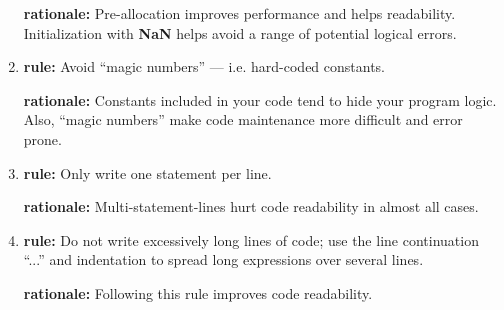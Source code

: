 \documentclass{tufte-book}
\theoremstyle{break}
\begin{document}
\begin{enumerate}
\textbf{rationale:} Pre-allocation improves performance and helps readability. Initialization with \textbf{NaN} helps avoid a range of potential logical errors.

\item \textbf{rule:} Avoid ``magic numbers'' --- i.e. hard-coded constants.

\textbf{rationale:} Constants included in your code tend to hide your program logic. Also, ``magic numbers'' make code maintenance more difficult and error prone.

\item \textbf{rule:} Only write one statement per line.

\textbf{rationale:} Multi-statement-lines hurt code readability in almost all cases.

\item \textbf{rule:} Do not write excessively long lines of code; use the line continuation ``...'' and indentation to spread long expressions over several lines.

\textbf{rationale:} Following this rule improves code readability.
\end{enumerate}


\printindex
\end{document}
